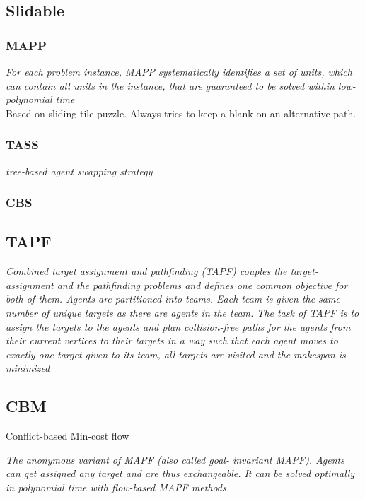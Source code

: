 \documentclass[a4paper,11pt]{article}
\begin{document}
\subsection{Slidable}
\subsubsection*{MAPP}
\cite{wang2011mapp}

\textit{For each problem instance, MAPP systematically identifies a set of units, which can contain all units in the instance, that are guaranteed to be solved within low-polynomial time} \\

Based on sliding tile puzzle. Always tries to keep a blank on an alternative path.

\subsubsection*{TASS}
\textit{tree-based agent swapping strategy}


\subsubsection{CBS}


\subsection{TAPF}

\textit{Combined target assignment and pathfinding (TAPF) couples the target-assignment and the pathfinding problems and defines one common objective for both of them. Agents are partitioned into teams.
Each team is given the same number of unique targets as there are agents in the team. The task of TAPF is to assign the targets to the agents and plan collision-free paths for the agents from their current vertices to their targets in a way such that each agent moves to exactly one target given to its team, all targets are visited and the makespan is minimized}

\subsection{CBM}
Conflict-based Min-cost flow

\textit{The anonymous variant of MAPF (also called goal- invariant MAPF). Agents can get assigned any target and are thus exchangeable. It can be solved optimally in polynomial time with flow-based MAPF methods}
\end{document}
